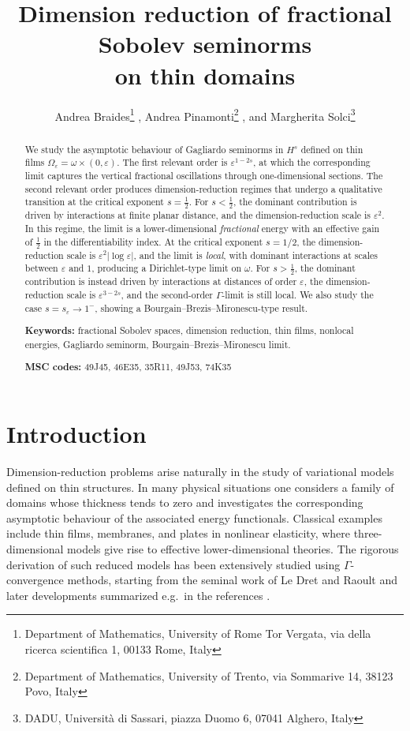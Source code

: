 \documentclass[11pt]{article}
\title{Dimension reduction of fractional Sobolev seminorms\\ on thin domains}
\author{Andrea Braides\footnote{Department of Mathematics, University of Rome Tor Vergata, via della ricerca scientifica 1, 00133 Rome, Italy} , Andrea Pinamonti\footnote{Department of Mathematics, University of Trento, via Sommarive 14, 38123 Povo, Italy} , and Margherita Solci\footnote{DADU, Universit\`a di Sassari, piazza Duomo 6, 07041 Alghero, Italy}}
\date{}
\def\e{\varepsilon}
\begin{document}
\maketitle

\begin{abstract}
We study the asymptotic behaviour of  Gagliardo seminorms in $H^s$ defined on thin films $\Omega_\e=\omega\times(0,\e)$. The first relevant order is $\e^{1-2s}$, at which the corresponding limit captures the vertical fractional oscillations through one-dimensional sections. The second relevant order produces dimension-reduction regimes that undergo a qualitative transition at the critical exponent $s=\tfrac12$. For $s<\tfrac12$, the dominant contribution is driven by interactions at finite planar distance, and the dimension-reduction scale is $\e^2$. In this regime, the limit is a lower-dimensional \emph{fractional} energy with an effective gain of $\tfrac12$ in the differentiability index. At the critical exponent $s=1/2$, the dimension-reduction scale is $\e^{2}|\log\e|$, and the limit is {\em local}, with dominant interactions at scales between $\e$ and $1$, producing a Dirichlet-type limit on $\omega$. For $s>\tfrac12$, the dominant contribution is instead driven by interactions at distances of order $\varepsilon$, the dimension-reduction scale is $\e^{3-2s}$, and the second-order $\Gamma$-limit is still local. We also study the case $s=s_\e\to 1^-$, showing a Bourgain--Brezis--Mironescu-type result.

{\bf Keywords:}
fractional Sobolev spaces,
dimension reduction,
thin films,
nonlocal energies,
Gagliardo seminorm,
Bourgain--Brezis--Mironescu limit.


{\bf MSC codes:}
49J45, 46E35, 35R11, 49J53, 74K35
\end{abstract}


\section{Introduction}
Dimension-reduction problems arise naturally in the study of variational models defined on thin structures. In many physical situations one considers a family of domains whose thickness tends to zero and investigates the corresponding asymptotic behaviour of the associated energy functionals. Classical examples include thin films, membranes, and plates in nonlinear elasticity, where three-dimensional models give rise to effective lower-dimensional theories. The rigorous derivation of such reduced models has been extensively studied using $\Gamma$-convergence methods, starting from the seminal work of Le Dret and Raoult \cite{LDR} and later developments summarized e.g.~in the references \cite{GCB,Handbook,BFF,MR2210909,MR1916989} .
\end{document}

